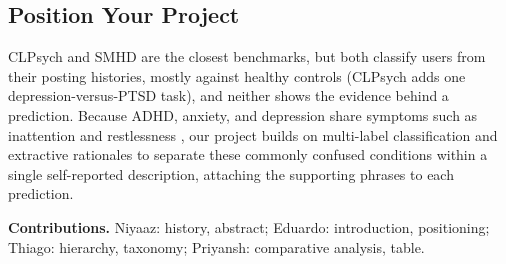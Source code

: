 \documentclass[sigconf]{acmart}
\begin{document}
\begin{table}[h]
\caption{Strengths and limitations by category.}
\label{tab:comparison}
\end{table}

\subsection{Position Your Project}
CLPsych \cite{coppersmith2015clpsych} and SMHD \cite{cohan2018smhd} are the closest benchmarks, but both classify users from their posting histories, mostly against healthy controls (CLPsych adds one depression-versus-PTSD task), and neither shows the evidence behind a prediction. Because ADHD, anxiety, and depression share symptoms such as inattention and restlessness \cite{fu2025adult}, our project builds on multi-label classification \cite{cohan2018smhd, souza2021deep} and extractive rationales \cite{lei2016rationalizing} to separate these commonly confused conditions within a single self-reported description, attaching the supporting phrases to each prediction.

\vspace{2mm}
\noindent \textbf{Contributions.} Niyaaz: history, abstract; Eduardo: introduction, positioning; Thiago: hierarchy, taxonomy; Priyansh: comparative analysis, table.
\end{document}
